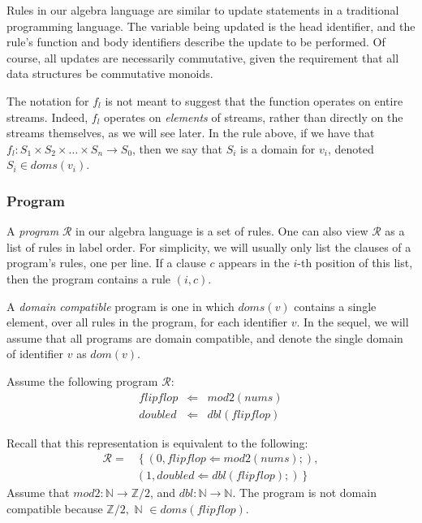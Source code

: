 Rules in our algebra language are similar to update statements in a traditional programming language.  The variable being updated is the head identifier, and the rule's function and body identifiers describe the update to be performed.  Of course, all updates are necessarily commutative, given the requirement that all data structures be commutative monoids.

The notation for $f_l$ is not meant to suggest that the function operates on entire streams.  Indeed, $f_l$ operates on {\em elements} of streams, rather than directly on the streams themselves, as we will see later.  In the rule above, if we have that $f_l : S_1 \times S_2 \times \dots \times S_n \rightarrow S_0$, then we say that $S_i$ is a domain for $v_i$, denoted $S_i \in doms(v_i)$.

\subsubsection{Program}

A {\em program} $\mathcal{R}$ in our algebra language is a set of rules.  One can also view $\mathcal{R}$ as a list of rules in label order.  For simplicity, we will usually only list the clauses of a program's rules, one per line.  If a clause $c$ appears in the $i$-th position of this list, then the program contains a rule $(i,c)$.

A {\em domain compatible} program is one in which $doms(v)$ contains a single element, over all rules in the program, for each identifier $v$.  In the sequel, we will assume that all programs are domain compatible, and denote the single domain of identifier $v$ as $dom(v)$.

\begin{example}
Assume the following program $\mathcal{R}$:
\begin{eqnarray*}
flipflop & \Leftarrow & mod2(nums) \\
doubled & \Leftarrow & dbl(flipflop)
\end{eqnarray*}

Recall that this representation is equivalent to the following:
\begin{equation*}
\begin{split}
\mathcal{R} = & \left\{(0, flipflop \Leftarrow mod2(nums);), \right. \\
& \left. (1, doubled \Leftarrow dbl(flipflop);) \right\}
\end{split}
\end{equation*}
Assume that $mod2 : \mathbb{N} \rightarrow \mathbb{Z}/2$, and $dbl : \mathbb{N} \rightarrow \mathbb{N}$.  The program is not domain compatible because $\mathbb{Z}/2, \,\, \mathbb{N} \,\, \in doms(flipflop)$.
\end{example}

